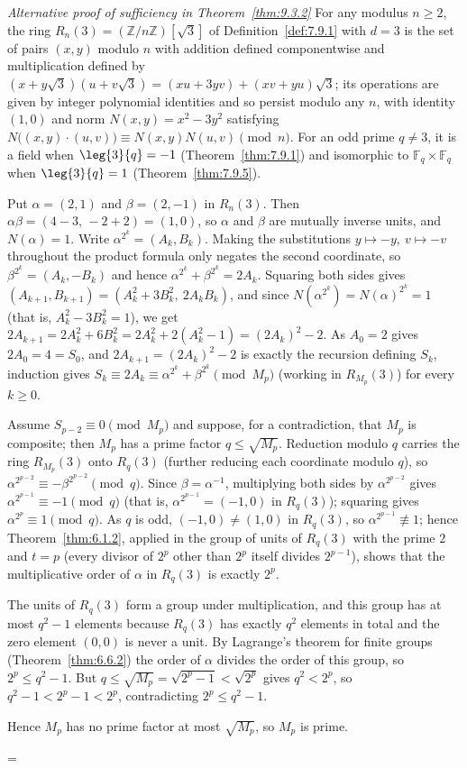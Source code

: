 \documentclass[11pt]{article}
\makeatletter
\theoremstyle{ntstyle}
\let\nt@closedisplay\]
\def\nt@guardedclose{\@ifnextchar\par{\nt@closeafterpar}{\@ifnextchar\end{\postdisplaypenalty\@M\nt@closedisplay}{\nt@closedisplay}}}
\def\nt@closeafterpar\par{\@ifnextchar\par{\nt@closeafterpar}{\@ifnextchar\end{\postdisplaypenalty\@M\nt@closedisplay\par}{\nt@closedisplay\par}}}
\renewenvironment{proof}[1][\proofname]{\par
  \pushQED{\qed}\normalfont\topsep\medskipamount\edef\nt@afterproof{\@endparpenalty=\the\@endparpenalty\relax}\@beginparpenalty\@M\@endparpenalty\@M\let\]\nt@guardedclose\trivlist\item[]\textit{#1\@addpunct{.}} \ignorespaces}{\ifvmode\addpenalty\@M\fi\popQED\nt@afterproof\endtrivlist\@endpefalse}
\newenvironment{altproof}[1][\proofname]{\begin{proof}[#1]\renewcommand{\qedsymbol}{}}{\end{proof}}
\makeatother
\begin{document}
\begin{altproof}[Alternative proof of sufficiency in Theorem~\ref{thm:9.3.2}]
	For any modulus $n\ge2$, the ring
	$R_n(3)=(\mathbb{Z}/n\mathbb{Z})[\sqrt{3}]$ of
	Definition~\ref{def:7.9.1} with $d=3$ is the set of pairs $(x,y)$ modulo
	$n$ with addition defined componentwise and multiplication defined by
	$(x+y\sqrt{3})(u+v\sqrt{3})=(xu+3yv)+(xv+yu)\sqrt{3}$; its operations
	are given by integer polynomial identities and so persist modulo any $n$, with
	identity $(1,0)$ and norm $N(x,y)=x^{2}-3y^{2}$ satisfying
	$N\big((x,y)\cdot(u,v)\big)\equiv N(x,y)N(u,v)\pmod{n}$. For an odd prime
	$q\neq3$, it is a field when $\leg{3}{q}=-1$
	(Theorem~\ref{thm:7.9.1}) and isomorphic to
	$\mathbb{F}_q\times\mathbb{F}_q$ when
	$\leg{3}{q}=1$ (Theorem~\ref{thm:7.9.5}).

	Put $\alpha=(2,1)$ and $\beta=(2,-1)$ in $R_n(3)$. Then
	$\alpha\beta=(4-3,\,-2+2)=(1,0)$, so $\alpha$ and $\beta$ are
	mutually inverse units, and $N(\alpha)=1$. Write
	$\alpha^{2^k}=(A_k,B_k)$. Making the substitutions $y\mapsto-y,\ v\mapsto-v$
	throughout the product formula only negates the second coordinate, so
	$\beta^{2^k}=(A_k,-B_k)$ and hence $\alpha^{2^k}+\beta^{2^k}=2A_k$.
	Squaring both sides gives $(A_{k+1},B_{k+1})=(A_k^2+3B_k^2,\ 2A_kB_k)$, and
	since $N(\alpha^{2^k})=N(\alpha)^{2^k}=1$ (that is, $A_k^2-3B_k^2=1$),
	we get $2A_{k+1}=2A_k^2+6B_k^2=2A_k^2+2(A_k^2-1)=(2A_k)^2-2$. As $A_0=2$
	gives $2A_0=4=S_0$, and $2A_{k+1}=(2A_k)^2-2$ is exactly the
	recursion defining $S_k$, induction gives
	$S_k\equiv2A_k\equiv\alpha^{2^k}+\beta^{2^k}\pmod{M_p}$ (working in
	$R_{M_p}(3)$) for every $k\ge0$.

	Assume $S_{p-2}\equiv0\pmod{M_p}$ and suppose, for a contradiction,
	that $M_p$ is composite; then $M_p$ has a prime factor
	$q\le\sqrt{M_p}$. Reduction modulo $q$ carries the ring $R_{M_p}(3)$ onto
	$R_q(3)$ (further reducing each coordinate modulo $q$), so
	$\alpha^{2^{p-2}}\equiv-\beta^{2^{p-2}}\pmod{q}$. Since
	$\beta=\alpha^{-1}$, multiplying both sides by $\alpha^{2^{p-2}}$
	gives $\alpha^{2^{p-1}}\equiv-1\pmod{q}$ (that is, $\alpha^{2^{p-1}}=(-1,0)$ in $R_q(3)$); squaring gives
	$\alpha^{2^{p}}\equiv1\pmod{q}$. As $q$ is odd, $(-1,0)\neq(1,0)$ in
	$R_q(3)$, so $\alpha^{2^{p-1}}\not\equiv1$; hence Theorem~\ref{thm:6.1.2}, applied in the group
	of units of $R_q(3)$ with the prime $2$ and $t=p$ (every divisor of $2^p$
	other than $2^p$ itself divides $2^{p-1}$), shows that the multiplicative
	order of $\alpha$ in $R_q(3)$ is exactly $2^p$.

	The units of $R_q(3)$ form a group under multiplication, and this group has at most
	$q^2-1$ elements because $R_q(3)$ has exactly $q^2$ elements in total
	and the zero element $(0,0)$ is never a unit. By Lagrange's theorem for finite groups (Theorem~\ref{thm:6.6.2})
	the order of $\alpha$ divides the order of this group, so $2^p\le
		q^2-1$. But $q\le\sqrt{M_p}=\sqrt{2^p-1}<\sqrt{2^p}$ gives $q^2<2^p$,
	so $q^2-1<2^p-1<2^p$, contradicting $2^p\le q^2-1$.

	Hence $M_p$ has no prime factor at most $\sqrt{M_p}$, so $M_p$ is prime.

\end{altproof}
\end{document}
